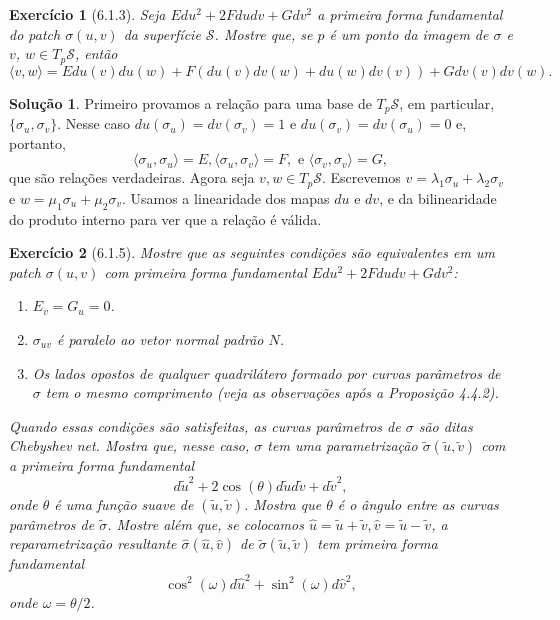 \documentclass[a4paper,12pt]{article}
\newcommand{\sur}{\mathcal{S}}
\theoremstyle{exer}
\newtheorem{exercise}{Exercício}
\theoremstyle{definition}
\newtheorem{solution}{Solução}
\theoremstyle{plain}
\begin{document}
\begin{exercise}[6.1.3]
    Seja $Edu^2 + 2Fdu dv + Gdv^2$ a primeira forma fundamental do patch
    $\sigma(u, v)$ da superfície $\mathcal{S}$. Mostre que, se $p$ é um
    ponto da imagem de $\sigma$ e $v$, $w \in T_p\mathcal{S}$, então 
    $$\langle v, w \rangle = Edu(v)du(w) + F(du(v)dv(w) + du(w)dv(v)) + Gdv(v)dv(w).$$
\end{exercise}

\begin{solution}
    Primeiro provamos a relação para uma base de $T_p\sur$, em particular,
    $\{\sigma_u, \sigma_v\}$. Nesse caso $du(\sigma_u) = dv(\sigma_v) = 1$ e
    $du(\sigma_v) = dv(\sigma_u) = 0$ e, portanto, 
    $$
    \langle \sigma_u, \sigma_u \rangle = E, \langle \sigma_u, \sigma_v \rangle = F, \text{ e } \langle \sigma_v, \sigma_v \rangle = G,
    $$
    que são relações verdadeiras. Agora seja $v,w \in T_p\sur$. Escrevemos $v
    = \lambda_1\sigma_u + \lambda_2\sigma_v$ e $w = \mu_1\sigma_u +
    \mu_2\sigma_v$. Usamos a linearidade dos mapas $du$ e $dv$, e da
    bilinearidade do produto interno para ver que a relação é válida. 
\end{solution}

\begin{exercise}[6.1.5]
    Mostre que as seguintes condições são equivalentes em um patch $\sigma(u,
    v)$ com primeira forma fundamental $Edu^2 + 2F dudv + Gdv^2$:
    \begin{enumerate}
        \item[(i)] $E_v = G_u = 0$.
        \item[(ii)] $\sigma_{uv}$ é paralelo ao vetor normal padrão $N$. 
        \item[(iii)] Os lados opostos de qualquer quadrilátero formado por curvas
        parâmetros de $\sigma$ tem o mesmo comprimento (veja as observações após a Proposição 4.4.2).   
    \end{enumerate}
    Quando essas condições são satisfeitas, as curvas parâmetros de $\sigma$
    são ditas {\em Chebyshev net.} Mostra que, nesse caso, $\sigma$ tem uma
    parametrização $\tilde{\sigma}(\tilde{u}, \tilde{v})$ com a primeira forma
    fundamental 
    $$
    d\tilde{u}^2 + 2\cos(\theta)d\tilde{u}d\tilde{v} + d\tilde{v}^2,
    $$
    onde $\theta$ é uma função suave de $(\tilde{u}, \tilde{v})$. Mostra que
    $\theta$ é o ângulo entre as curvas parâmetros de $\tilde{\sigma}$.
    Mostre além que, se colocamos $\hat{u} = \tilde{u} + \tilde{v}, \hat{v} =
    \tilde{u} - \tilde{v}$, a reparametrização resultante
    $\hat{\sigma}(\hat{u}, \hat{v})$ de $\tilde{\sigma}(\tilde{u}, \tilde{v})$
    tem primeira forma fundamental 
    $$
    \cos^2(\omega)d\hat{u}^2 + \sin^2(\omega)d\hat{v}^2, 
    $$
    onde $\omega = \theta/2$. 
\end{exercise}
\end{document}
